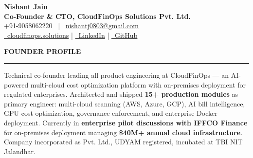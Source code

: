 \documentclass[a4paper,10pt]{article}
\newcommand{\cvsection}[1]{%
  \vspace{2mm}
  \noindent\textbf{\large\MakeUppercase{#1}}
  \vspace{1mm}
  \hrule
  \vspace{1.5mm}
}
\begin{document}
\selectfont

\begin{center}
    {\Huge \textbf{Nishant Jain}} \\[2pt]
    \textbf{Co-Founder \& CTO, CloudFinOps Solutions Pvt. Ltd.} \\[3pt]
    +91-9058062220 \, | \, \href{mailto:nishantj0803@gmail.com}{nishantj0803@gmail.com} \\[2pt]
    \href{https://www.cloudfinops.solutions}{\faGlobe\, cloudfinops.solutions}
    \quad | \quad
    \href{https://linkedin.com/in/nishant-jain-7baa07284}{\faLinkedin\, LinkedIn}
    \quad | \quad
    \href{https://github.com/nishantj0803}{\faGithub\, GitHub}
\end{center}

\cvsection{Founder Profile}
Technical co-founder leading all product engineering at CloudFinOps --- an AI-powered multi-cloud cost optimization platform with on-premises deployment for regulated enterprises. Architected and shipped \textbf{15+ production modules} as primary engineer: multi-cloud scanning (AWS, Azure, GCP), AI bill intelligence, GPU cost optimization, governance enforcement, and enterprise Docker deployment. Currently in \textbf{enterprise pilot discussions with IFFCO Finance} for on-premises deployment managing \textbf{\$40M+ annual cloud infrastructure}. Company incorporated as Pvt. Ltd., UDYAM registered, incubated at TBI NIT Jalandhar.
\end{document}
